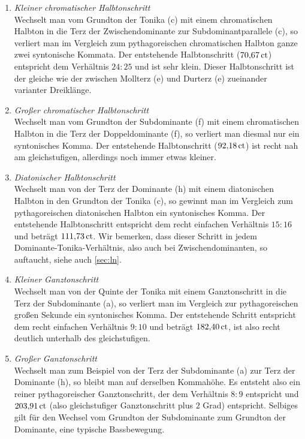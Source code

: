 \begin{enumerate}
\item \emph{Kleiner chromatischer Halbtonschritt}\\
  Wechselt man vom Grundton der Tonika (c) mit einem chromatischen Halbton in
  die Terz der Zwischendominante zur Subdominantparallele (\sharpmm c), so
  verliert man im Vergleich zum pythagoreischen chromatischen Halbton ganze
  zwei syntonische Kommata. Der entstehende Halbtonschritt ($70{,}67\,\text{ct}$)
  entspricht dem Verhältnis $24:25$ und ist sehr klein. Dieser Halbtonschritt
  ist der gleiche wie der zwischen Mollterz (\flatp e) und Durterz
  (\naturalm e) zueinander varianter Dreiklänge.
\item \emph{Großer chromatischer Halbtonschritt}\\
  Wechselt man vom Grundton der Subdominante (f) mit einem chromatischen
  Halbton in die Terz der Doppeldominante (\sharpm f), so verliert man diesmal
  nur ein syntonisches Komma.  Der entstehende Halbtonschritt
  ($92{,}18\,\text{ct}$) ist recht nah am gleichstufigen, allerdings
  noch immer etwas kleiner.\setcounter{enumi}{3}
\item \emph{Diatonischer Halbtonschritt}\\
  Wechselt man von der Terz der Dominante (\naturalm h) mit einem diatonischen
  Halbton in den Grundton der Tonika (c), so gewinnt man im Vergleich zum
  pythagoreischen diatonischen Halbton ein syntonisches Komma.  Der
  entstehende Halbtonschritt entspricht dem recht einfachen Verhältnis $15:16$
  und beträgt $111{,}73\,\text{ct}$.  Wir bemerken, dass dieser Schritt in jedem
  Dominante-Tonika-Verhältnis, also auch bei Zwischendominanten, so auftaucht,
  siehe auch \cref{sec:ln}.
\item \emph{Kleiner Ganztonschritt}\\
  Wechselt man von der Quinte der Tonika mit einem Ganztonschritt in die Terz
  der Subdominante (\naturalm a), so verliert man im Vergleich zur
  pythagoreischen großen Sekunde ein syntonisches Komma. Der entstehende Schritt
  entspricht dem recht einfachen Verhältnis \mbox{$9:10$} und beträgt $182{,}40\,\text{ct}$,
  ist also recht deutlich unterhalb des gleichstufigen.
\item \emph{Großer Ganztonschritt}\\
  Wechselt man zum Beispiel von der Terz der Subdominante (\naturalm a) zur Terz
  der Dominante (\naturalm h), so bleibt man auf derselben Kommahöhe. Es
  entsteht also ein reiner pythagoreischer Ganztonschritt, der dem Verhältnis
  $8:9$ entspricht und $203{,}91\,\text{ct}$ (also gleichstufiger Ganztonschritt plus
  $2$ Grad) entspricht.  Selbiges gilt für den Wechsel vom Grundton der
  Subdominante zum Grundton der Dominante, eine typische Bassbewegung.
\end{enumerate}

